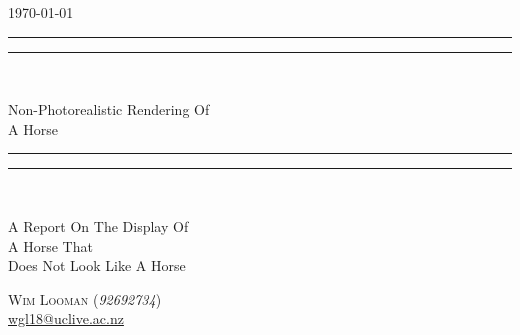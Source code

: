 \begin{titlepage}
\centering
\vspace*{\baselineskip}

\flushright\today\\
\centering
\rule{\textwidth}{1.6pt}\vspace*{-\baselineskip}\vspace*{2pt}
\rule{\textwidth}{0.4pt}\\[\baselineskip]

{\Huge \scshape

  Non-Photorealistic Rendering
  Of\\
  A Horse

}

\rule{\textwidth}{0.4pt}\vspace*{-\baselineskip}\vspace*{3.2pt}
\rule{\textwidth}{1.6pt}\\[2\baselineskip]
{\scshape \large

  A Report On The Display Of\\
  A Horse That\\
  Does Not Look Like A Horse

}


\vspace*{3\baselineskip}
{\Large

  {\scshape Wim Looman} (\emph{92692734})\\
  \href{mailto:wgl18@uclive.ac.nz}{wgl18@uclive.ac.nz}\\
}

\end{titlepage}
